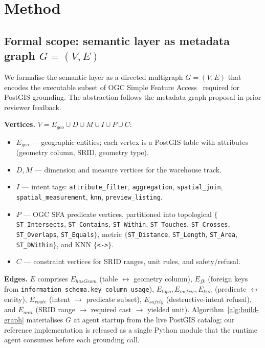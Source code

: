 \documentclass[11pt]{article}
\begin{document}
\section{Method}
\label{sec:method}

\subsection{Formal scope: semantic layer as metadata graph \texorpdfstring{$G=(V,E)$}{G=(V,E)}}
\label{sec:formal-scope}

We formalise the semantic layer as a directed multigraph $G = (V, E)$ that
encodes the executable subset of OGC Simple Feature Access~\cite{ogcsfs}
required for PostGIS grounding. The abstraction follows the metadata-graph
proposal in prior reviewer feedback.

\noindent\textbf{Vertices.} $V = E_{geo} \cup D \cup M \cup I \cup P \cup C$:
\begin{itemize}[leftmargin=*,nosep]
\item $E_{geo}$ --- geographic entities; each vertex is a PostGIS table with
  attributes (geometry column, SRID, geometry type).
\item $D, M$ --- dimension and measure vertices for the warehouse track.
\item $I$ --- intent tags: \texttt{attribute\_filter}, \texttt{aggregation},
  \texttt{spatial\_join}, \texttt{spatial\_measurement}, \texttt{knn},
  \texttt{preview\_listing}.
\item $P$ --- OGC SFA predicate vertices, partitioned into topological
  $\{$\texttt{ST\_Intersects}, \texttt{ST\_Contains}, \texttt{ST\_Within},
  \texttt{ST\_Touches}, \texttt{ST\_Crosses}, \texttt{ST\_Overlaps},
  \texttt{ST\_Equals}$\}$, metric $\{$\texttt{ST\_Distance},
  \texttt{ST\_Length}, \texttt{ST\_Area}, \texttt{ST\_DWithin}$\}$, and KNN
  $\{$\texttt{<->}$\}$.
\item $C$ --- constraint vertices for SRID ranges, unit rules, and
  safety/refusal.
\end{itemize}

\noindent\textbf{Edges.} $E$ comprises $E_{hasGeom}$ (table $\leftrightarrow$
geometry column), $E_{fk}$ (foreign keys from
\texttt{information\_schema.key\_column\_usage}),
$E_{topo}, E_{metric}, E_{knn}$ (predicate $\leftrightarrow$ entity),
$E_{route}$ (intent $\to$ predicate subset),
$E_{safety}$ (destructive-intent refusal), and
$E_{unit}$ (SRID range $\to$ required cast $\to$ yielded unit).
Algorithm~\ref{alg:build-graph} materialises $G$ at agent startup from the
live PostGIS catalog; our reference implementation is released as a single
Python module that the runtime agent consumes before each grounding call.
\end{document}
